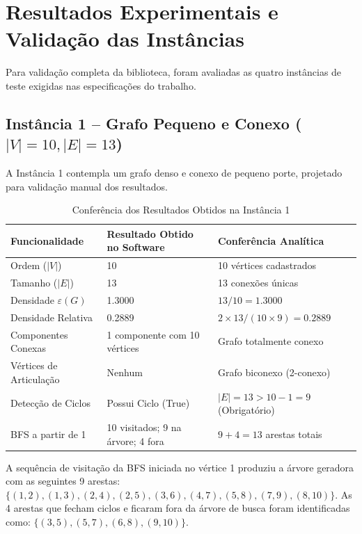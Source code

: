\documentclass[12pt,a4paper]{article}
\begin{document}
\section{Resultados Experimentais e Validação das Instâncias}

Para validação completa da biblioteca, foram avaliadas as quatro instâncias de teste exigidas nas especificações do trabalho.

\subsection{Instância 1 -- Grafo Pequeno e Conexo ($|V|=10, |E|=13$)}
A Instância 1 contempla um grafo denso e conexo de pequeno porte, projetado para validação manual dos resultados.



\begin{table}[H]
    \centering
    \caption{Conferência dos Resultados Obtidos na Instância 1}
    \begin{tabular}{@{}lll@{}}
        \toprule
        \textbf{Funcionalidade} & \textbf{Resultado Obtido no Software} & \textbf{Conferência Analítica} \\ \midrule
        Ordem ($|V|$) & 10 & 10 vértices cadastrados \\
        Tamanho ($|E|$) & 13 & 13 conexões únicas \\
        Densidade $\varepsilon(G)$ & 1.3000 & $13 / 10 = 1.3000$ \\
        Densidade Relativa & 0.2889 & $2 \times 13 / (10 \times 9) = 0.2889$ \\
        Componentes Conexas & 1 componente com 10 vértices & Grafo totalmente conexo \\
        Vértices de Articulação & Nenhum & Grafo biconexo (2-conexo) \\
        Detecção de Ciclos & Possui Ciclo (True) & $|E| = 13 > 10 - 1 = 9$ (Obrigatório) \\
        BFS a partir de 1 & 10 visitados; 9 na árvore; 4 fora & $9 + 4 = 13$ arestas totais \\ \bottomrule
    \end{tabular}
    \label{tab:res_instancia1}
\end{table}

A sequência de visitação da BFS iniciada no vértice 1 produziu a árvore geradora com as seguintes 9 arestas:
$\{(1,2), (1,3), (2,4), (2,5), (3,6), (4,7), (5,8), (7,9), (8,10)\}$.
As 4 arestas que fecham ciclos e ficaram fora da árvore de busca foram identificadas como:
$\{(3,5), (5,7), (6,8), (9,10)\}$.
\end{document}
